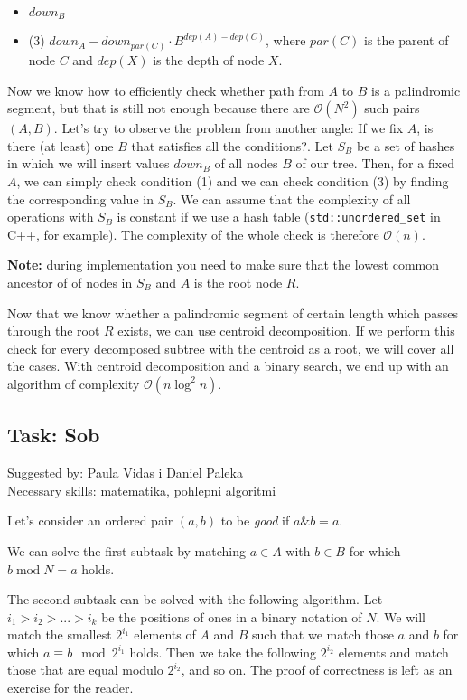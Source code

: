 \documentclass[a4paper]{article}
\begin{document}
\begin{itemize}
  \item $down_B$
  \item (3) $down_A - down_{par(C)} \cdot B^{dep(A)-dep(C)}$, where $par(C)$ is
        the parent of node $C$ and $dep(X)$ is the depth of node $X$.
\end{itemize}

Now we know how to efficiently check whether path from $A$ to $B$ is a
palindromic segment, but that is still not enough because there are $\mathcal{O}(N^2)$
such pairs $(A, B)$. Let's try to observe the problem from another angle: If we
fix $A$, is there (at least) one $B$ that satisfies all the conditions?. Let
$S_B$ be a set of hashes in which we will insert values $down_B$ of all nodes
$B$ of our tree. Then, for a fixed $A$, we can simply check condition (1) and
we can check condition (3) by finding the corresponding value in $S_B$. We can
assume that the complexity of all operations with $S_B$ is constant if we use
a hash table (\texttt{std::unordered\_set} in C++, for example). The complexity
of the whole check is therefore $\mathcal{O}(n)$.

\textbf{Note:} during implementation you need to make sure that the lowest
common ancestor of of nodes in $S_B$ and $A$ is the root node $R$.

Now that we know whether a palindromic segment of certain length which passes
through the root $R$ exists, we can use centroid decomposition. If we perform
this check for every decomposed subtree with the centroid as a root, we will
cover all the cases. With centroid decomposition and a binary search, we end up
with an algorithm of complexity  $\mathcal{O}(n \log^2 n)$.

\subsection*{Task: Sob}
\textsf{Suggested by: Paula Vidas i Daniel Paleka}\\
\textsf{Necessary skills: matematika, pohlepni algoritmi}

Let's consider an ordered pair $(a, b)$ to be \emph{good} if $a \mathbin\& b = a$.

We can solve the first subtask by matching $a \in A$ with $b \in B$ for which
$b \mathbin{\textrm{mod}} N = a$ holds.

The second subtask can be solved with the following algorithm. Let
$i_1 > i_2 > ... > i_k$ be the positions of ones in a binary notation
of $N$. We will match the smallest $2^{i_1}$ elements of $A$ and $B$ such that
we match those $a$ and $b$ for which $a \equiv b \mod 2^{i_1}$ holds. Then we
take the following $2^{i_2}$ elements and match those that are equal modulo
$2^{i_2}$, and so on. The proof of correctness is left as an exercise for the
reader.
\end{document}
